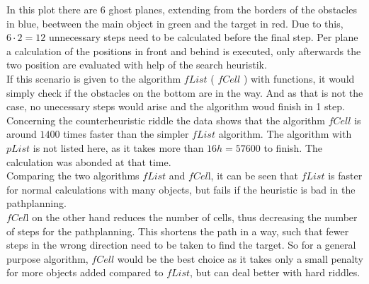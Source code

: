 In this plot there are 6 ghost planes, extending from the borders of the obstacles in blue, beetween the main object in green and the target in red. Due to this, $6\cdot2 = 12$ unnecessary steps need to be calculated before the final step. Per plane a calculation of the positions in front and behind is executed, only afterwards the two position are evaluated with help of the search heuristik.\\
If this scenario is given to the algorithm $fList$ ( $fCell$ ) with functions, it would simply check if the obstacles on the bottom are in the way. And as that is not the case, no unecessary steps would arise and the algorithm woud finish in 1 step.\\
\newline
Concerning the counterheuristic riddle the data shows that the algorithm $fCell$ is around $1400$ times faster than the simpler $fList$ algorithm. The algorithm with $pList$ is not listed here, as it takes more than $16h = 57600$ to finish. The calculation was abonded at that time.\\
Comparing the two algorithms $fList$ and $fCel$l, it can be seen that $fList$ is faster for normal calculations with many objects, but fails if the heuristic is bad in the pathplanning. \\
$fCel$l on the other hand reduces the number of cells, thus decreasing the number of steps for the pathplanning. This shortens the path in a way, such that fewer steps in the wrong direction need to be taken to find the target. So for a general purpose algorithm, $fCell$ would be the best choice as it takes only a small penalty for more objects added compared to $fList$, but can deal better with hard riddles.